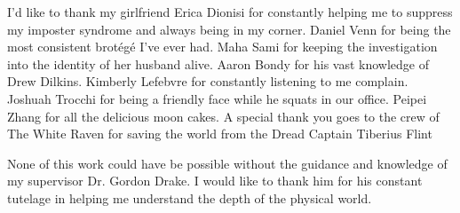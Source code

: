 I'd like to thank my girlfriend Erica Dionisi for constantly helping me to suppress my imposter syndrome and always being in my corner. Daniel Venn for being the most consistent brotégé I've ever had. Maha Sami for keeping the investigation into the identity of her husband alive. Aaron Bondy for his vast knowledge of Drew Dilkins. Kimberly Lefebvre for constantly listening to me complain. Joshuah Trocchi for being a friendly face while he squats in our office. Peipei Zhang for all the delicious moon cakes. A special thank you goes to the crew of The White Raven for saving the world from the Dread Captain Tiberius Flint

None of this work could have be possible without the guidance and knowledge of my supervisor Dr. Gordon Drake. I would like to thank him for his constant tutelage in helping me understand the depth of the physical world.